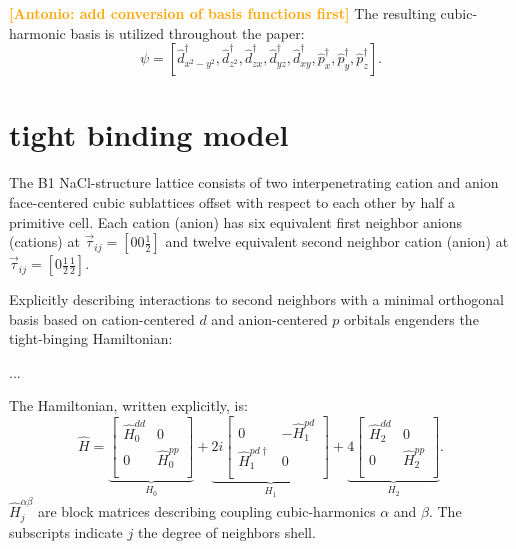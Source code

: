 \documentclass[twocolumn,showpacs,preprintnumbers,superscriptaddress,prb,floatfix,aps,10pt]{revtex4-1}
\newcommand{\abmei}[1]{\textcolor{orange}{ \bf [Antonio: #1] }}
\newcommand*{\ham}{\hat{H}}
\newcommand*{\zeromat}{0}
\begin{document}
\abmei{add conversion of basis functions first}
The resulting cubic-harmonic basis is utilized throughout the paper:
\begin{equation}
\psi = [ \hat{d}_{x^2-y^2}^\dag, \hat{d}_{z^2}^\dag, \hat{d}_{zx}^\dag, \hat{d}_{yz}^\dag, \hat{d}_{xy}^\dag, \hat{p}_{x}^\dag, \hat{p}_{y}^\dag, \hat{p}_{z}^\dag ].
\end{equation}




%
%
\section{tight binding model}
\label{appendix:tb}

The B1 NaCl-structure lattice consists of two interpenetrating cation and anion face-centered cubic sublattices offset with respect to each other by half a primitive cell. Each cation (anion) has six equivalent first neighbor anions (cations) at $\vec{\tau}_{ij} = [0 0 \frac{1}{2}]$ and twelve equivalent second neighbor cation (anion) at $\vec{\tau}_{ij} = [0 \frac{1}{2} \frac{1}{2}]$. 



Explicitly describing interactions to second neighbors with a minimal orthogonal basis based on cation-centered $d$ and anion-centered $p$ orbitals engenders the tight-binging Hamiltonian: 



...


The Hamiltonian, written explicitly, is:
\begin{equation}
\label{eq:ham_explicit}
\hat{H} = 
\underbrace{
\begin{bmatrix}
\hat{H}_0^{dd} & \zeromat \\
\zeromat & \hat{H}_0^{pp} \\
\end{bmatrix}}_{H_0}
 + 
\underbrace{
 2i
\begin{bmatrix}
\zeromat              & -\hat{H}_1^{pd} \\
\hat{H}_1^{pd\dagger} &  \zeromat        \\
\end{bmatrix}}_{H_1}
 + 
\underbrace{
 4
\begin{bmatrix}
\hat{H}_2^{dd} & \zeromat       \\
\zeromat       & \hat{H}_2^{pp} \\
\end{bmatrix}}_{H_2}.
\end{equation}
$\ham_{j}^{\alpha\beta}$ are block matrices describing coupling cubic-harmonics $\alpha$ and $\beta$. The subscripts indicate $j$ the degree of neighbors shell.
\end{document}
